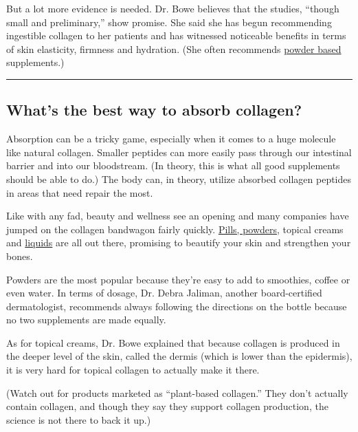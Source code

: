 But a lot more evidence is needed. Dr. Bowe believes that the studies,
``though small and preliminary,'' show promise. She said she has begun
recommending ingestible collagen to her patients and has witnessed
noticeable benefits in terms of skin elasticity, firmness and hydration.
(She often recommends
\href{https://onlinelibrary.wiley.com/doi/full/10.1111/jocd.12174}{powder
based} supplements.)

\begin{center}\rule{0.5\linewidth}{\linethickness}\end{center}

\hypertarget{whats-the-best-way-to-absorb-collagen}{%
\subsection{What's the best way to absorb
collagen?}\label{whats-the-best-way-to-absorb-collagen}}

Absorption can be a tricky game, especially when it comes to a huge
molecule like natural collagen. Smaller peptides can more easily pass
through our intestinal barrier and into our bloodstream. (In theory,
this is what all good supplements should be able to do.) The body can,
in theory, utilize absorbed collagen peptides in areas that need repair
the most.

Like with any fad, beauty and wellness see an opening and many companies
have jumped on the collagen bandwagon fairly quickly.
\href{https://pubs.acs.org/doi/abs/10.1021/acs.jafc.6b05679}{Pills,
powders}, topical creams and
\href{http://www.jmnn.org/article.asp?issn=2278-1870;year=2015;volume=4;issue=1;spage=47;epage=53;aulast=Borumand}{liquids}
are all out there, promising to beautify your skin and strengthen your
bones.

Powders are the most popular because they're easy to add to smoothies,
coffee or even water. In terms of dosage, Dr. Debra Jaliman, another
board-certified dermatologist, recommends always following the
directions on the bottle because no two supplements are made equally.

As for topical creams, Dr. Bowe explained that because collagen is
produced in the deeper level of the skin, called the dermis (which is
lower than the epidermis), it is very hard for topical collagen to
actually make it there.

(Watch out for products marketed as ``plant-based collagen.'' They don't
actually contain collagen, and though they say they support collagen
production, the science is not there to back it up.)

